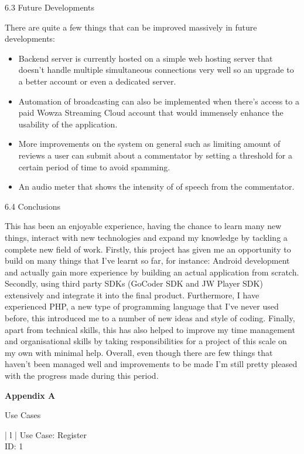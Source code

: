 \documentclass{article}
\begin{document}
\begin{flushleft}
{\Large 6.3 Future Developments}\par
There are quite a few things that can be improved massively in future developments:
\begin{itemize}
	\item Backend server is currently hosted on a simple web hosting server that doesn't handle multiple simultaneous connections very well so an upgrade to a better account or even a dedicated server.
	\item Automation of broadcasting can also be implemented when there's access to a paid Wowza Streaming Cloud account that would immensely enhance the usability of the application.
	\item More improvements on the system on general such as limiting amount of reviews a user can submit about a commentator by setting a threshold for a certain period of time to avoid spamming.
	\item An audio meter that shows the intensity of of speech from the commentator. 
\end{itemize}
{\Large 6.4 Conclusions}\par
This has been an enjoyable experience, having the chance to learn many new things, interact with new technologies and expand my knowledge by tackling a complete new field of work. Firstly, this project has given me an opportunity to build on many things that I've learnt so far, for instance: Android development and actually gain more experience by building an actual application from scratch. Secondly, using third party SDKs (GoCoder SDK and JW Player SDK) extensively and integrate it into the final product. Furthermore, I have experienced PHP, a new type of programming language that I've never used before, this introduced me to a number of new ideas and style of coding. Finally, apart from technical skills, this has also helped to improve my time management and organisational skills by taking responsibilities for a project of this scale on my own with minimal help. Overall, even though there are few things that haven't been managed well and improvements to be made I'm still pretty pleased with the progress made during this period.\par
\newpage
{\Large \textbf{Appendix A}}\par
{\huge Use Cases}\par
\begin{longtable}{ | l |}
\hline
{} {Use Case: Register}\\
\hline
ID: 1\\

\end{longtable}
\end{flushleft}
\end{document}
